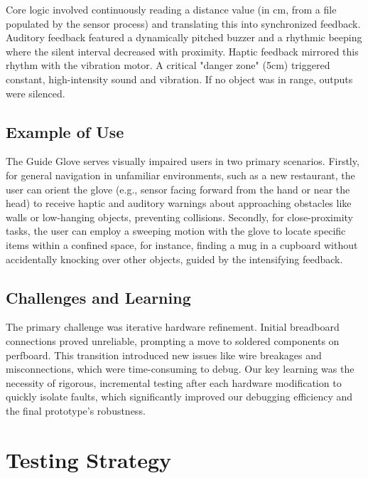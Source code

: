 \documentclass[11pt]{article}
\begin{document}
Core logic involved continuously reading a distance value (in cm, from a file populated by the sensor process) and translating this into synchronized feedback. Auditory feedback featured a dynamically pitched buzzer and a rhythmic beeping where the silent interval decreased with proximity. Haptic feedback mirrored this rhythm with the vibration motor. A critical "danger zone" (5cm) triggered constant, high-intensity sound and vibration. If no object was in range, outputs were silenced.

\subsection{Example of Use}
The Guide Glove serves visually impaired users in two primary scenarios. Firstly, for general navigation in unfamiliar environments, such as a new restaurant, the user can orient the glove (e.g., sensor facing forward from the hand or near the head) to receive haptic and auditory warnings about approaching obstacles like walls or low-hanging objects, preventing collisions. Secondly, for close-proximity tasks, the user can employ a sweeping motion with the glove to locate specific items within a confined space, for instance, finding a mug in a cupboard without accidentally knocking over other objects, guided by the intensifying feedback.

\subsection{Challenges and Learning}
The primary challenge was iterative hardware refinement. Initial breadboard connections proved unreliable, prompting a move to soldered components on perfboard. This transition introduced new issues like wire breakages and misconnections, which were time-consuming to debug. Our key learning was the necessity of rigorous, incremental testing after each hardware modification to quickly isolate faults, which significantly improved our debugging efficiency and the final prototype's robustness.


\section{Testing Strategy}
\end{document}
